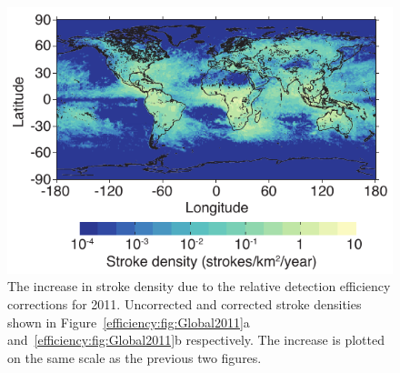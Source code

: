 \begin{figure}[ht!]
   \centering
\noindent\includegraphics[scale=1]{efficiency/Figures/2012RS005049-p16.pdf}
   \caption{The increase in stroke density due to the relative detection efficiency corrections for 2011.
Uncorrected and corrected stroke densities shown in Figure~\ref{efficiency:fig:Global2011}a and~\ref{efficiency:fig:Global2011}b respectively.
The increase is plotted on the same scale as the previous two figures.}
   \label{efficiency:fig:Global2011Diff}
\end{figure}

